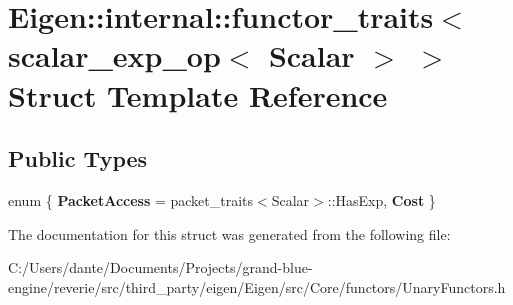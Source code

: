\hypertarget{struct_eigen_1_1internal_1_1functor__traits_3_01scalar__exp__op_3_01_scalar_01_4_01_4}{}\section{Eigen\+::internal\+::functor\+\_\+traits$<$ scalar\+\_\+exp\+\_\+op$<$ Scalar $>$ $>$ Struct Template Reference}
\label{struct_eigen_1_1internal_1_1functor__traits_3_01scalar__exp__op_3_01_scalar_01_4_01_4}
\subsection*{Public Types}
\begin{DoxyCompactItemize}
\item 
\mbox{\label{struct_eigen_1_1internal_1_1functor__traits_3_01scalar__exp__op_3_01_scalar_01_4_01_4_a6fbe16db3bfc77cfe5a77d15c21df416}} 
enum \{ {\bfseries Packet\+Access} = packet\+\_\+traits$<$Scalar$>$\+::Has\+Exp, 
{\bfseries Cost}
 \}
\end{DoxyCompactItemize}


The documentation for this struct was generated from the following file\+:\begin{DoxyCompactItemize}
\item 
C\+:/\+Users/dante/\+Documents/\+Projects/grand-\/blue-\/engine/reverie/src/third\+\_\+party/eigen/\+Eigen/src/\+Core/functors/Unary\+Functors.\+h\end{DoxyCompactItemize}
